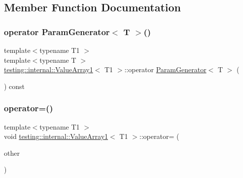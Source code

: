 \subsection{Member Function Documentation}
\mbox{\label{classtesting_1_1internal_1_1_value_array1_a1ffe0a28fd09efa980df1aaa3f7af2a0}} 
\subsubsection{\texorpdfstring{operator ParamGenerator$<$ T $>$()}{operator ParamGenerator< T >()}}
{\footnotesize\ttfamily template$<$typename T1 $>$ \\
template$<$typename T $>$ \\
\mbox{\hyperlink{classtesting_1_1internal_1_1_value_array1}{testing\+::internal\+::\+Value\+Array1}}$<$ T1 $>$\+::operator \mbox{\hyperlink{classtesting_1_1internal_1_1_param_generator}{Param\+Generator}}$<$ T $>$ (\begin{DoxyParamCaption}{ }\end{DoxyParamCaption}) const\hspace{0.3cm}{\ttfamily [inline]}}

\mbox{\label{classtesting_1_1internal_1_1_value_array1_af2a3cc5b27d7c9bb8ad56eaf09054631}} 
\subsubsection{\texorpdfstring{operator=()}{operator=()}}
{\footnotesize\ttfamily template$<$typename T1 $>$ \\
void \mbox{\hyperlink{classtesting_1_1internal_1_1_value_array1}{testing\+::internal\+::\+Value\+Array1}}$<$ T1 $>$\+::operator= (\begin{DoxyParamCaption}\item[{const \mbox{\hyperlink{classtesting_1_1internal_1_1_value_array1}{Value\+Array1}}$<$ T1 $>$ \&}]{other }\end{DoxyParamCaption})\hspace{0.3cm}{\ttfamily [private]}}



